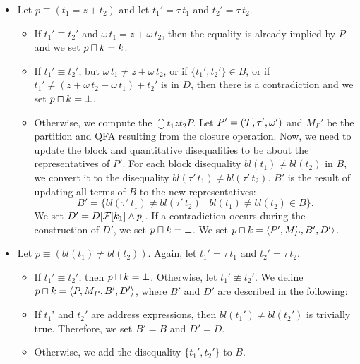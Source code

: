\begin{itemize}
    \item Let $p \equiv (t_1 = z + t_2)$ and let $t_1'=\tau\,t_1$ and $t_2'=\tau\,t_2$.
          \begin{itemize}
              \item If $t_1' \equiv t_2'$ and $\omega\,t_1 = z + \omega\,t_2$,
                    then the equality is already implied by $P$ and we set $p \sqcap k = k$.
              \item If $t_1' \equiv t_2'$, but $\omega\,t_1 \neq z + \omega\,t_2$,
                    or if $\{t_1',t_2'\}\in B$, or if $t_1' \neq (z + \omega\,t_2 - \omega\,t_1) + t_2'$ is in $D$,
                    then there is a contradiction and we set $p \sqcap k = \bot$.
              \item Otherwise, we compute the $\closure{t_1}{z}{t_2}{P}$.
                    Let $P' = (\mathcal{T}, \tau', \omega')$ and $M_P'$ be the partition and QFA resulting from the closure operation.
                    Now, we need to update the block and quantitative disequalities to be about the representatives of $P'$.
                    For each block disequality $bl(t_1) \neq bl(t_2)$ in $B$, we convert it to the disequality $bl(\tau'\,t_1) \neq bl(\tau'\,t_2)$.
                    $B'$ is the result of updating all terms of $B$ to the new representatives:
                    \[
                        B' = \{bl(\tau'\,t_1) \neq bl(\tau'\,t_2) \mid bl(t_1) \neq bl(t_2) \in B\}.
                    \]
                    We set $D' = D[\mathcal{F}[k_1] \land p]$.
                    If a contradiction occurs during the construction of $D'$, we set $p \sqcap k = \bot$.
                    We set $p \sqcap k = \langle P',M_P',B',D'\rangle$.
          \end{itemize}
    \item Let $p \equiv (bl(t_1) \neq bl(t_2))$. Again, let $t_1'=\tau\,t_1$ and $t_2'=\tau\,t_2$.
          \begin{itemize}
              \item If $t_1' \equiv t_2'$, then $p \sqcap k = \bot$.
                    Otherwise, let $t_1' \nequiv t_2'$. We define $p \sqcap k = \langle P,M_P,B', D'\rangle$, where $B'$ and $D'$ are described in the following:
              \item If $t_1$' and $t_2'$ are address expressions, then $bl(t_1') \neq bl(t_2')$ is trivially true.
                    Therefore, we set $B'= B$ and $D'=D$.
              \item Otherwise, we add the disequality $\{t_1',t_2'\}$ to $B$.

\end{itemize}
\end{itemize}
